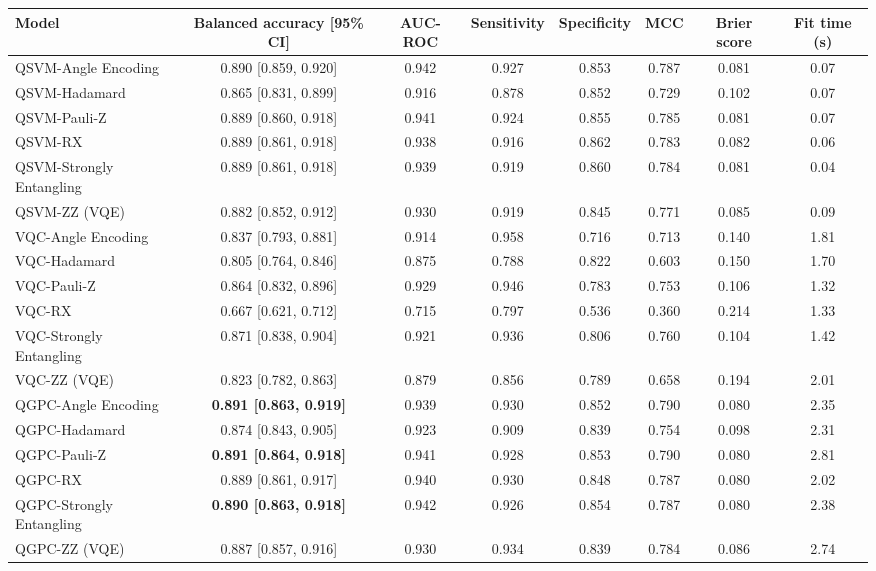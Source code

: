 \begin{tabular}{lccccccc}
\toprule
Model & Balanced accuracy [95\% CI] & AUC-ROC & Sensitivity & Specificity & MCC & Brier score & Fit time (s) \\
\midrule
QSVM-Angle Encoding & 0.890 [0.859, 0.920] & 0.942 & 0.927 & 0.853 & 0.787 & 0.081 & 0.07 \\
QSVM-Hadamard & 0.865 [0.831, 0.899] & 0.916 & 0.878 & 0.852 & 0.729 & 0.102 & 0.07 \\
QSVM-Pauli-Z & 0.889 [0.860, 0.918] & 0.941 & 0.924 & 0.855 & 0.785 & 0.081 & 0.07 \\
QSVM-RX & 0.889 [0.861, 0.918] & 0.938 & 0.916 & 0.862 & 0.783 & 0.082 & 0.06 \\
QSVM-Strongly Entangling & 0.889 [0.861, 0.918] & 0.939 & 0.919 & 0.860 & 0.784 & 0.081 & 0.04 \\
QSVM-ZZ (VQE) & 0.882 [0.852, 0.912] & 0.930 & 0.919 & 0.845 & 0.771 & 0.085 & 0.09 \\
\midrule
VQC-Angle Encoding & 0.837 [0.793, 0.881] & 0.914 & 0.958 & 0.716 & 0.713 & 0.140 & 1.81 \\
VQC-Hadamard & 0.805 [0.764, 0.846] & 0.875 & 0.788 & 0.822 & 0.603 & 0.150 & 1.70 \\
VQC-Pauli-Z & 0.864 [0.832, 0.896] & 0.929 & 0.946 & 0.783 & 0.753 & 0.106 & 1.32 \\
VQC-RX & 0.667 [0.621, 0.712] & 0.715 & 0.797 & 0.536 & 0.360 & 0.214 & 1.33 \\
VQC-Strongly Entangling & 0.871 [0.838, 0.904] & 0.921 & 0.936 & 0.806 & 0.760 & 0.104 & 1.42 \\
VQC-ZZ (VQE) & 0.823 [0.782, 0.863] & 0.879 & 0.856 & 0.789 & 0.658 & 0.194 & 2.01 \\
\midrule
QGPC-Angle Encoding & \textbf{0.891 [0.863, 0.919]} & 0.939 & 0.930 & 0.852 & 0.790 & 0.080 & 2.35 \\
QGPC-Hadamard & 0.874 [0.843, 0.905] & 0.923 & 0.909 & 0.839 & 0.754 & 0.098 & 2.31 \\
QGPC-Pauli-Z & \textbf{0.891 [0.864, 0.918]} & 0.941 & 0.928 & 0.853 & 0.790 & 0.080 & 2.81 \\
QGPC-RX & 0.889 [0.861, 0.917] & 0.940 & 0.930 & 0.848 & 0.787 & 0.080 & 2.02 \\
QGPC-Strongly Entangling & \textbf{0.890 [0.863, 0.918]} & 0.942 & 0.926 & 0.854 & 0.787 & 0.080 & 2.38 \\
QGPC-ZZ (VQE) & 0.887 [0.857, 0.916] & 0.930 & 0.934 & 0.839 & 0.784 & 0.086 & 2.74 \\
\midrule

\end{tabular}
